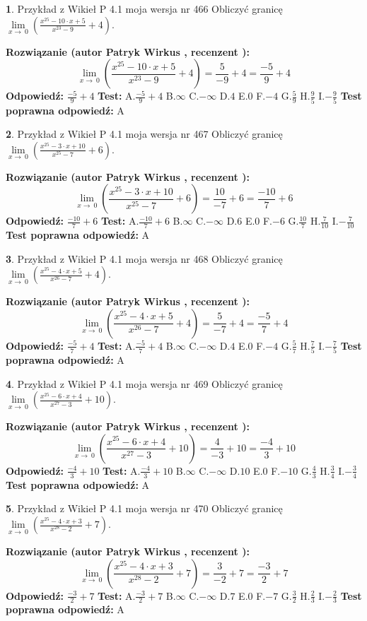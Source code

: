 \documentclass[12pt, a4paper]{article}
\theoremstyle{definition} %
\newtheorem{zad}{}
\newcommand{\zadStart}[1]{\begin{zad}#1\newline}
\newcommand{\zadStop}{\end{zad}}
\newcommand{\rozwStart}[2]{\noindent \textbf{Rozwiązanie (autor #1 , recenzent #2): }\newline}
\newcommand{\rozwStop}{\newline}
\newcommand{\odpStart}{\noindent \textbf{Odpowiedź:}\newline}
\newcommand{\odpStop}{\newline}
\newcommand{\testStart}{\noindent \textbf{Test:}\newline}
\newcommand{\testStop}{\newline}
\newcommand{\kluczStart}{\noindent \textbf{Test poprawna odpowiedź:}\newline}
\newcommand{\kluczStop}{\newline}
\begin{document}
\zadStart{Przykład z Wikieł P 4.1 moja wersja nr 466}
Obliczyć granicę $\lim\limits_{x\to\ 0}(\frac{x^{25}-10 \cdot x +5}{x^{23}-9}+4)$.
\zadStop
\rozwStart{Patryk Wirkus}{}
$$\lim\limits_{x\to\ 0}(\frac{x^{25}-10 \cdot x +5}{x^{23}-9}+4)=\frac{5}{-9}+4=\frac{-5}{9}+4$$
\rozwStop
\odpStart
$\frac{-5}{9}+4$
\odpStop
\testStart
A.$\frac{-5}{9}+4$
B.$\infty$
C.$-\infty$
D.$4$
E.$0$
F.$-4$
G.$\frac{5}{9}$
H.$\frac{9}{5}$
I.$-\frac{9}{5}$
\testStop
\kluczStart
A
\kluczStop



\zadStart{Przykład z Wikieł P 4.1 moja wersja nr 467}
Obliczyć granicę $\lim\limits_{x\to\ 0}(\frac{x^{25}-3 \cdot x +10}{x^{25}-7}+6)$.
\zadStop
\rozwStart{Patryk Wirkus}{}
$$\lim\limits_{x\to\ 0}(\frac{x^{25}-3 \cdot x +10}{x^{25}-7}+6)=\frac{10}{-7}+6=\frac{-10}{7}+6$$
\rozwStop
\odpStart
$\frac{-10}{7}+6$
\odpStop
\testStart
A.$\frac{-10}{7}+6$
B.$\infty$
C.$-\infty$
D.$6$
E.$0$
F.$-6$
G.$\frac{10}{7}$
H.$\frac{7}{10}$
I.$-\frac{7}{10}$
\testStop
\kluczStart
A
\kluczStop



\zadStart{Przykład z Wikieł P 4.1 moja wersja nr 468}
Obliczyć granicę $\lim\limits_{x\to\ 0}(\frac{x^{25}-4 \cdot x +5}{x^{26}-7}+4)$.
\zadStop
\rozwStart{Patryk Wirkus}{}
$$\lim\limits_{x\to\ 0}(\frac{x^{25}-4 \cdot x +5}{x^{26}-7}+4)=\frac{5}{-7}+4=\frac{-5}{7}+4$$
\rozwStop
\odpStart
$\frac{-5}{7}+4$
\odpStop
\testStart
A.$\frac{-5}{7}+4$
B.$\infty$
C.$-\infty$
D.$4$
E.$0$
F.$-4$
G.$\frac{5}{7}$
H.$\frac{7}{5}$
I.$-\frac{7}{5}$
\testStop
\kluczStart
A
\kluczStop



\zadStart{Przykład z Wikieł P 4.1 moja wersja nr 469}
Obliczyć granicę $\lim\limits_{x\to\ 0}(\frac{x^{25}-6 \cdot x +4}{x^{27}-3}+10)$.
\zadStop
\rozwStart{Patryk Wirkus}{}
$$\lim\limits_{x\to\ 0}(\frac{x^{25}-6 \cdot x +4}{x^{27}-3}+10)=\frac{4}{-3}+10=\frac{-4}{3}+10$$
\rozwStop
\odpStart
$\frac{-4}{3}+10$
\odpStop
\testStart
A.$\frac{-4}{3}+10$
B.$\infty$
C.$-\infty$
D.$10$
E.$0$
F.$-10$
G.$\frac{4}{3}$
H.$\frac{3}{4}$
I.$-\frac{3}{4}$
\testStop
\kluczStart
A
\kluczStop



\zadStart{Przykład z Wikieł P 4.1 moja wersja nr 470}
Obliczyć granicę $\lim\limits_{x\to\ 0}(\frac{x^{25}-4 \cdot x +3}{x^{28}-2}+7)$.
\zadStop
\rozwStart{Patryk Wirkus}{}
$$\lim\limits_{x\to\ 0}(\frac{x^{25}-4 \cdot x +3}{x^{28}-2}+7)=\frac{3}{-2}+7=\frac{-3}{2}+7$$
\rozwStop
\odpStart
$\frac{-3}{2}+7$
\odpStop
\testStart
A.$\frac{-3}{2}+7$
B.$\infty$
C.$-\infty$
D.$7$
E.$0$
F.$-7$
G.$\frac{3}{2}$
H.$\frac{2}{3}$
I.$-\frac{2}{3}$
\testStop
\kluczStart
A
\kluczStop
\end{document}
